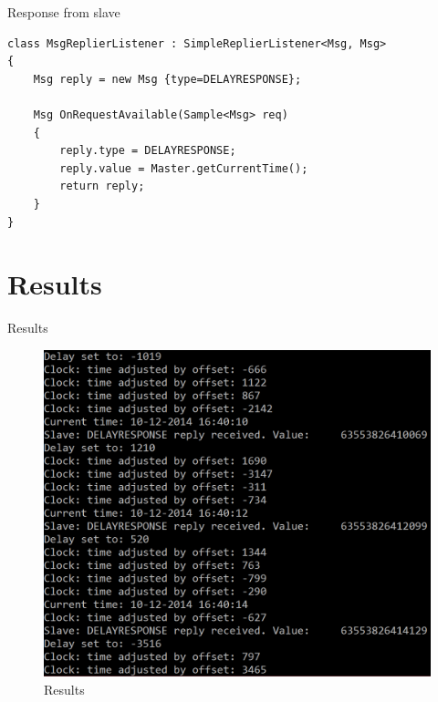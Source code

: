 \documentclass[compressed, presentation, notheorems, 12pt]{beamer}
\begin{document}
\begin{frame}[containsverbatim]{Response from slave}
	\begin{lstlisting}[style=Code-C++]
class MsgReplierListener : SimpleReplierListener<Msg, Msg>
{
	Msg reply = new Msg {type=DELAYRESPONSE};

	Msg OnRequestAvailable(Sample<Msg> req)
	{
		reply.type = DELAYRESPONSE;
		reply.value = Master.getCurrentTime();
		return reply;
	}
}
	\end{lstlisting}

	\end{frame}


\section{Results}
\begin{frame}{Results}

\begin{figure}[hbtp]
\centering
\includegraphics[width = 0.82 \textwidth]{SlaveScreen}
\caption{Results}
\end{figure}


\end{frame}
\end{document}
